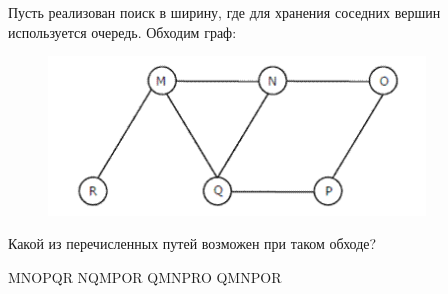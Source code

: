 \documentclass[12pt]{exam}
\begin{document}
\begin{questions}
\question[2] Пусть реализован поиск в ширину, где для хранения соседних вершин используется очередь. Обходим граф:
\begin{figure}[H]
  \begin{center}
    \includegraphics[width=10cm]{bfs.png}
  \end{center}
\end{figure}
Какой из перечисленных путей возможен при таком обходе?
\begin{checkboxes}
\choice MNOPQR
\choice NQMPOR
\CorrectChoice QMNPRO
\choice QMNPOR
\end{checkboxes}

\end{questions}
\end{document}
